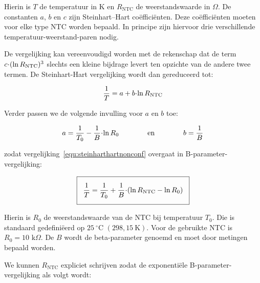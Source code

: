 \documentclass[12pt,a4paper,final,twoside,fleqn]{article}
\newcommand{\rntc}{R_\text{NTC}}
\let\oldcdot\cdot
\renewcommand{\cdot}{\kern-.10em\oldcdot\kern-.10em}
\begin{document}
Hierin is $T$ de temperatuur in K en $\rntc$ de weerstandswaarde in $\Omega$.
De constanten $a$, $b$ en $c$ zijn Steinhart–Hart co\"effici\"enten. Deze
co\"effici\"enten moeten voor elke type NTC worden bepaald. In principe
zijn hiervoor drie verschillende temperatuur-weerstand-paren nodig.

De vergelijking kan vereenvoudigd worden met de rekenschap dat de term
$c\cdot( \ln \rntc )^3$ slechts een kleine bijdrage levert ten opzichte van
de andere twee termen. De Steinhart-Hart vergelijking wordt dan gereduceerd
tot:

\begin{equation}
\label{equ:steinharthartnonconf}
\dfrac{1}{T} = a + b\cdot\ln \rntc 
\end{equation}

Verder passen we de volgende invulling voor $a$ en $b$ toe:

\begin{equation}
\label{equ:substaandb}
a = \dfrac{1}{T_0} - \dfrac{1}{B}\cdot \ln R_0 \qquad\qquad \text{en} \qquad\qquad
b = \dfrac{1}{B}
\end{equation}


zodat vergelijking~\eqref{equ:steinharthartnonconf} overgaat in B-parameter-vergelijking:

\begin{equation}
\label{equ:steinharthartsimpl}
\setlength\fboxsep{2ex}
\boxed{\dfrac{1}{T} = \dfrac{1}{T_0} + \dfrac{1}{B}\cdot (\ln\rntc - \ln R_0)}
\end{equation}

Hierin is $R_0$ de weerstandswaarde van de NTC bij temperatuur $T_0$. Die is standaard
gedefini\"eerd op $25\:^\circ\text{C}$ $(298,15\: \text{K})$. Voor de gebruikte NTC
is $R_0 = 10\text{ k}\Omega$.
De $B$ wordt de beta-parameter genoemd en  moet door metingen bepaald worden.

We kunnen $\rntc$ expliciet schrijven zodat de exponenti\"ele B-parameter-vergelijking
als volgt wordt:
\end{document}
